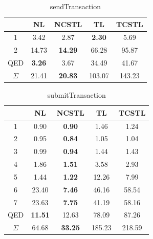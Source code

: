 \documentclass[../thesis.tex]{subfiles}
\begin{document}
\begin{table}[h]
\centering
\begin{tabular}{|c|c|c|c|c|}
\hline
\textbf{} & \textbf{NL} & \textbf{NCSTL} & \textbf{TL} & \textbf{TCSTL} \\
\hline
1 & 3.42 & 2.87 & \textbf{2.30} & 5.69 \\
\hline
2 & 14.73 & \textbf{14.29} & 66.28 & 95.87 \\
\hline
QED & \textbf{3.26} & 3.67 & 34.49 & 41.67 \\
\hline
$\Sigma$ & 21.41 & \textbf{20.83} & 103.07 & 143.23 \\
\hline
\end{tabular}
\caption{sendTransaction}
\label{tab:block1}
\end{table}

\begin{table}[h]
\centering
\begin{tabular}{|c|c|c|c|c|}
\hline
\textbf{} & \textbf{NL} & \textbf{NCSTL} & \textbf{TL} & \textbf{TCSTL} \\
\hline
1 & 0.90 & \textbf{0.90} & 1.46 & 1.24 \\
\hline
2 & 0.95 & \textbf{0.84} & 1.05 & 1.04 \\
\hline
3 & 0.99 & \textbf{0.94} & 1.44 & 1.43 \\
\hline
4 & 1.86 & \textbf{1.51} & 3.58 & 2.93 \\
\hline
5 & 1.44 & \textbf{1.22} & 12.26 & 7.99 \\
\hline
6 & 23.40 & \textbf{7.46} & 46.16 & 58.54 \\
\hline
7 & 23.63 & \textbf{7.75} & 41.19 & 58.16 \\
\hline
QED & \textbf{11.51} & 12.63 & 78.09 & 87.26 \\
\hline
$\Sigma$ & 64.68 & \textbf{33.25} & 185.23 & 218.59 \\
\hline
\end{tabular}
\caption{submitTransaction}
\label{tab:block2}
\end{table}
\end{document}
